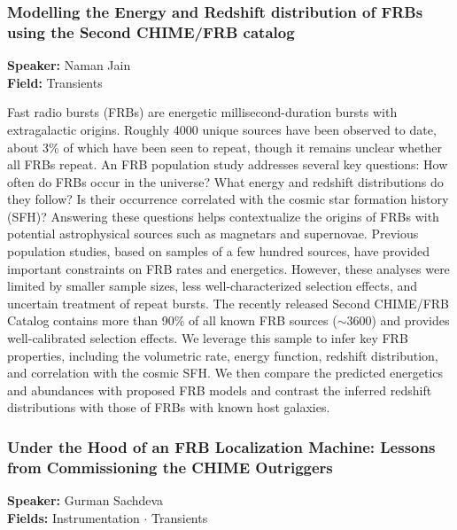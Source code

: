 \hypertarget{abstract-talk-33}{}\label{abstract-page-talk-33}
\subsubsection*{Modelling the Energy and Redshift distribution of FRBs using the Second CHIME/FRB catalog}
\textbf{Speaker:} Naman Jain\\
\textbf{Field:} Transients

Fast radio bursts (FRBs) are energetic millisecond-duration bursts with extragalactic origins. Roughly 4000 unique sources have been observed to date, about 3\% of which have been seen to repeat, though it remains unclear whether all FRBs repeat. An FRB population study addresses several key questions: How often do FRBs occur in the universe? What energy and redshift distributions do they follow? Is their occurrence correlated with the cosmic star formation history (SFH)? Answering these questions helps contextualize the origins of FRBs with potential astrophysical sources such as magnetars and supernovae. Previous population studies, based on samples of a few hundred sources, have provided important constraints on FRB rates and energetics. However, these analyses were limited by smaller sample sizes, less well-characterized selection effects, and uncertain treatment of repeat bursts. The recently released Second CHIME/FRB Catalog contains more than 90\% of all known FRB sources ($\sim$3600) and provides well-calibrated selection effects. We leverage this sample to infer key FRB properties, including the volumetric rate, energy function, redshift distribution, and correlation with the cosmic SFH. We then compare the predicted energetics and abundances with proposed FRB models and contrast the inferred redshift distributions with those of FRBs with known host galaxies.

\hypertarget{abstract-talk-304}{}\label{abstract-page-talk-304}
\subsubsection*{Under the Hood of an FRB Localization Machine: Lessons from Commissioning the CHIME Outriggers}
\textbf{Speaker:} Gurman Sachdeva\\
\textbf{Fields:} Instrumentation $\cdot$ Transients

